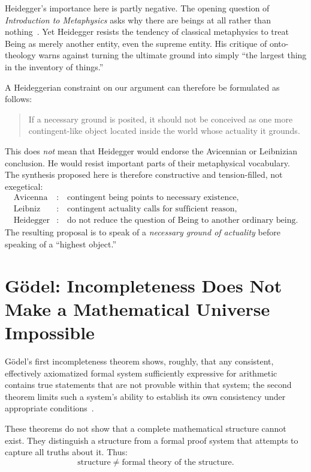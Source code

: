 \documentclass[11pt,letterpaper]{article}
\theoremstyle{plain}
\theoremstyle{definition}
\begin{document}
Heidegger's importance here is partly negative. The opening question of \emph{Introduction to Metaphysics} asks why there are beings at all rather than nothing~\cite{heidegger}. Yet Heidegger resists the tendency of classical metaphysics to treat Being as merely another entity, even the supreme entity. His critique of onto-theology warns against turning the ultimate ground into simply ``the largest thing in the inventory of things.''

A Heideggerian constraint on our argument can therefore be formulated as follows:
\begin{quote}
If a necessary ground is posited, it should not be conceived as one more contingent-like object located inside the world whose actuality it grounds.
\end{quote}

This does \emph{not} mean that Heidegger would endorse the Avicennian or Leibnizian conclusion. He would resist important parts of their metaphysical vocabulary. The synthesis proposed here is therefore constructive and tension-filled, not exegetical:
\begin{align*}
  \text{Avicenna} &: \quad \text{contingent being points to necessary existence,}\\
  \text{Leibniz} &: \quad \text{contingent actuality calls for sufficient reason,}\\
  \text{Heidegger} &: \quad \text{do not reduce the question of Being to another ordinary being.}
\end{align*}
The resulting proposal is to speak of a \emph{necessary ground of actuality} before speaking of a ``highest object.''

\section{Gödel: Incompleteness Does Not Make a Mathematical Universe Impossible}

Gödel's first incompleteness theorem shows, roughly, that any consistent, effectively axiomatized formal system sufficiently expressive for arithmetic contains true statements that are not provable within that system; the second theorem limits such a system's ability to establish its own consistency under appropriate conditions~\cite{goedel}.

These theorems do not show that a complete mathematical structure cannot exist. They distinguish a structure from a formal proof system that attempts to capture all truths about it. Thus:
\[
  \text{structure} \neq \text{formal theory of the structure}.
\]
\end{document}
